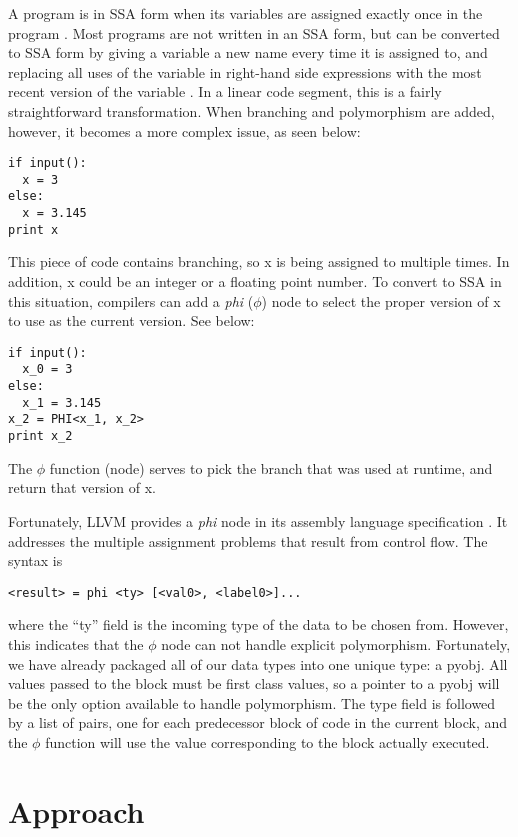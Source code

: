 \documentclass[11pt,twocolumn]{article}
\begin{document}
A program is in SSA form when its variables are assigned exactly once
in the program \cite{gcc-gnu.org}. Most programs are not written in an
SSA form, but can be converted to SSA form by giving a variable a new
name every time it is assigned to, and replacing all uses of the
variable in right-hand side expressions with the most recent version
of the variable \cite{brandis-mossenbock}. In a linear code segment,
this is a fairly straightforward transformation. When branching and
polymorphism are added, however, it becomes a more complex issue, as
seen below:

\begin{verbatim}
if input():
  x = 3
else:
  x = 3.145
print x
\end{verbatim}

This piece of code contains branching, so x is being assigned to
multiple times. In addition, x could be an integer or a floating point
number. To convert to SSA in this situation, compilers can add a
\emph{phi} ($\phi$) node to select the proper version of x to use as
the current version. See below:

\begin{verbatim}
if input():
  x_0 = 3
else:
  x_1 = 3.145
x_2 = PHI<x_1, x_2>
print x_2
\end{verbatim}

The $\phi$ function (node) serves to pick the branch that was used at
runtime, and return that version of x.

Fortunately, LLVM provides a \emph{phi} node in its assembly language
specification \cite{lattner-llvmlangref}. It addresses the multiple
assignment problems that result from control flow. The syntax is

\begin{verbatim}
<result> = phi <ty> [<val0>, <label0>]...
\end{verbatim} 

where the ``ty'' field is the incoming type of the data to be chosen
from. However, this indicates that the $\phi$ node can not handle
explicit polymorphism. Fortunately, we have already packaged all of
our data types into one unique type: a pyobj. All values passed to the
block must be first class values, so a pointer to a pyobj will be the
only option available to handle polymorphism. The type field is
followed by a list of pairs, one for each predecessor block of code in
the current block, and the $\phi$ function will use the value
corresponding to the block actually executed.

\section{Approach}
\end{document}
